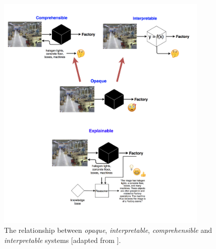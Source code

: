 \begin{figure}[htbp]
\centerline{\includegraphics[width=0.9\textwidth]{introduction/images/xai-systems-taxonomy}}
\caption{The relationship between \textit{opaque}, \textit{interpretable},  \textit{comprehensible} and \textit{interpretable} systems [adapted from \citep{Doran2018}].}
\label{fig:xai-systems-taxonomy}
\end{figure}

